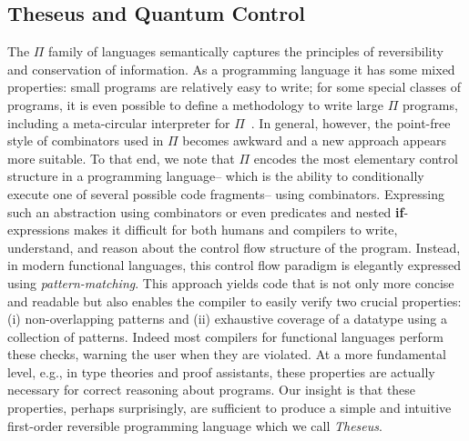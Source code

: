 \documentclass{article}
\begin{document}
\subsection{Theseus and Quantum Control}
 
The $\Pi$ family of languages semantically captures the principles of
reversibility and conservation of information. As a programming
language it has some mixed properties: small programs are relatively
easy to write; for some special classes of programs, it is even
possible to define a methodology to write large $\Pi$ programs,
including a meta-circular interpreter for $\Pi$~\cite{isoint}. In
general, however, the point-free style of combinators used in $\Pi$
becomes awkward and a new approach appears more suitable. To that end,
we note that $\Pi$ encodes the most elementary control structure in a
programming language-- which is the ability to conditionally execute
one of several possible code fragments-- using combinators. Expressing
such an abstraction using combinators or even predicates and nested
\textbf{if}-expressions makes it difficult for both humans and
compilers to write, understand, and reason about the control flow
structure of the program. Instead, in modern functional languages,
this control flow paradigm is elegantly expressed using
\emph{pattern-matching}. This approach yields code that is not only
more concise and readable but also enables the compiler to easily
verify two crucial properties: (i) non-overlapping patterns and (ii)
exhaustive coverage of a datatype using a collection of
patterns. Indeed most compilers for functional languages perform these
checks, warning the user when they are violated. At a more fundamental
level, e.g., in type theories and proof assistants, these properties
are actually necessary for correct reasoning about programs. Our
insight is that these properties, perhaps surprisingly, are sufficient
to produce a simple and intuitive first-order reversible programming
language which we call \emph{Theseus}.
\end{document}
